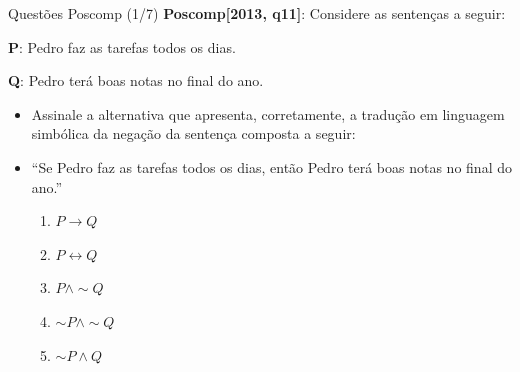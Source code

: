 \documentclass[aspectratio=169]{beamer}
\begin{document}
\begin{frame}{Questões Poscomp (1/7)}
    \textbf{Poscomp[2013, q11]}: Considere as sentenças a seguir:

    \textbf{P}: Pedro faz as tarefas todos os dias.

    \textbf{Q}: Pedro terá boas notas no final do ano.

    \begin{itemize}
        \item Assinale a alternativa que apresenta, corretamente, a tradução em linguagem simbólica da negação da sentença composta a seguir:
        \item “Se Pedro faz as tarefas todos os dias, então Pedro terá boas notas no final do ano.”
              \begin{enumerate}
                  \item $P \rightarrow Q $
                  \item $ P \leftrightarrow Q $
                  \item $ P \wedge \sim Q$
                  \item $\sim P \wedge \sim Q$
                  \item $\sim P \wedge Q $
              \end{enumerate}
    \end{itemize}

\end{frame}
\end{document}
